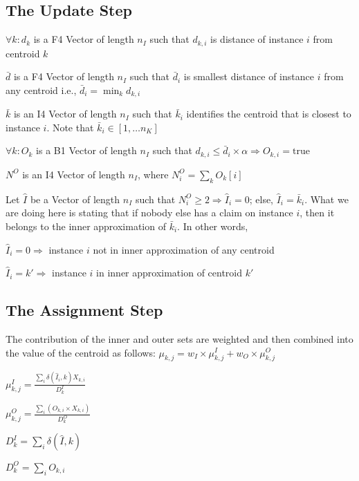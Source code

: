 \subsection{The Update Step}
\label{update}

\be
\item \(\forall k: d_k \) is a F4 Vector of length \(n_I\) such that \(d_{k, i}\)
is distance of instance \(i\) from centroid \(k\)
\item \(\bar{d}\) is a F4 Vector of length \(n_I\) such that \(\bar{d}_i\) is
smallest distance of instance \(i\) from any centroid i.e.,
\(\bar{d}_i = \min_k d_{k, i}\)
\item \(\bar{k}\) is an I4 Vector of length \(n_I\) such that \(\bar{k}_i\) identifies
the centroid that is closest to instance \(i\). Note that 
\(\bar{k}_i \in [1, \ldots n_K]\)
\item \(\forall k: O_k\) is a B1 Vector of length \(n_I\) such that 
\(d_{k, i} \leq \bar{d}_i \times \alpha \Rightarrow O_{k, i} = \mathrm{true}\)
\item \(N^O\) is an I4 Vector of length \(n_I\), 
where \(N^O_i  = \sum_k O_k[i]\)
\item Let \(\hat{I}\) be a Vector of length \(n_I\) such that 
\(N^O_i \geq 2 \Rightarrow \hat{I}_i = 0\); else, \(\hat{I}_i = \bar{k}_i\). What
we are doing here is stating that if nobody else has a claim on instance \(i\), then
it belongs to the inner approximation of \(\bar{k}_i\). In other words,
\be
\item \(\hat{I}_i = 0 \Rightarrow \) instance \(i\) not in inner approximation
of any centroid
\item \(\hat{I}_i = k' \Rightarrow \) instance \(i\) in inner approximation
of centroid \(k'\)
\ee
\ee

\subsection{The Assignment Step}
\label{assignment}

\be
\item The contribution of the inner and outer sets are weighted and then
combined into the value of the centroid as follows:
\(\mu_{k, j} = w_I \times \mu^I_{k, j} +  w_O \times \mu^O_{k, j} \)
\item 
\(\mu^I_{k, j} = \frac{\sum_i \delta(\hat{I}_i, k) X_{k, i}}{D^I_k}\)
\item 
\(\mu^O_{k, j} = \frac{\sum_i (O_{k, i} \times X_{k, i})}{D^O_k}\)
\item \(D^I_k = \sum_i \delta(\hat{I}, k)\)
\item \(D^O_k = \sum_i O_{k, i}\)
\ee


